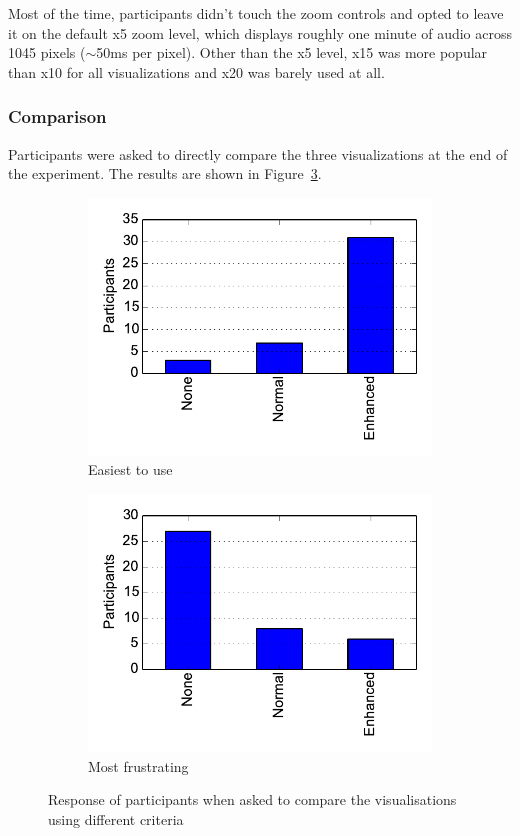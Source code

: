 Most of the time, participants didn't touch the zoom controls and opted to leave
it on the default x5 zoom level, which displays roughly one minute of audio
across 1045 pixels ($\sim$50ms per pixel). Other than the x5 level, x15 was
more popular than x10 for all visualizations and x20 was barely used at all.

\subsubsection{Comparison}
Participants were asked to directly compare the three visualizations at the end
of the experiment. The results are shown in Figure~\ref{fig:compare}.

\begin{figure}[ht]
\centering
\begin{subfigure}{.5\textwidth}
  \centering
  \includegraphics[width=\textwidth]{figs/easiest.pdf}
  \caption{Easiest to use}
  \label{fig:easiest}
\end{subfigure}%
\begin{subfigure}{.5\textwidth}
  \centering
  \includegraphics[width=\linewidth]{figs/frustrating.pdf}
  \caption{Most frustrating}
  \label{fig:frustrating}
\end{subfigure}
\caption{Response of participants when asked to compare the visualisations
  using different criteria}
\label{fig:compare}
\end{figure}

